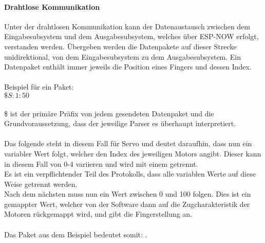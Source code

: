 \documentclass[titlepage,12pt,twoside]{article}
\begin{document}
\paragraph{Drahtlose Kommunikation}
\label{par:Drahtlose Kommunikation}
\hfill \break
\hfill \break
Unter der drahtlosen Kommunikation kann der Datenaustausch zwischen dem Eingabesubsystem und dem Ausgabesubsystem, welches über ESP-NOW erfolgt, verstanden werden. 
Übergeben werden die Datenpakete auf dieser Strecke unidirektional, von dem Eingabesubsystem zu dem Ausgabesubsystem. Ein Datenpaket enthält immer jeweils 
die Position eines Fingers und dessen Index. \\
\\
Beispiel für ein Paket: \\
$\$S:1:50$ \\
\\
\$ ist der primäre Präfix von jedem gesendeten Datenpaket und die Grundvoraussetzung, dass der jeweilige Parser es überhaupt interpretiert. \\
\\
Das folgende  steht in diesem Fall für Servo und deutet daraufhin, dass nun ein variabler Wert folgt, welcher den Index des jeweiligen Motors angibt. 
Dieser kann in diesem Fall von 0-4 variieren und wird mit einem \textquote{:} getrennt. \\
Es ist ein verpflichtender Teil des Protokolls, dass alle variablen Werte auf diese Weise getrennt werden. \\
Nach dem nächsten \textquote{:} muss nun ein Wert zwischen 0 und 100 folgen. Dies ist ein gemappter Wert, welcher von der Software dann auf die Zugcharakteristik 
der Motoren rückgemappt wird, und gibt die Fingerstellung an. \\
\\
Das Paket aus dem Beispiel bedeutet somit: . \\
\\
\end{document}
